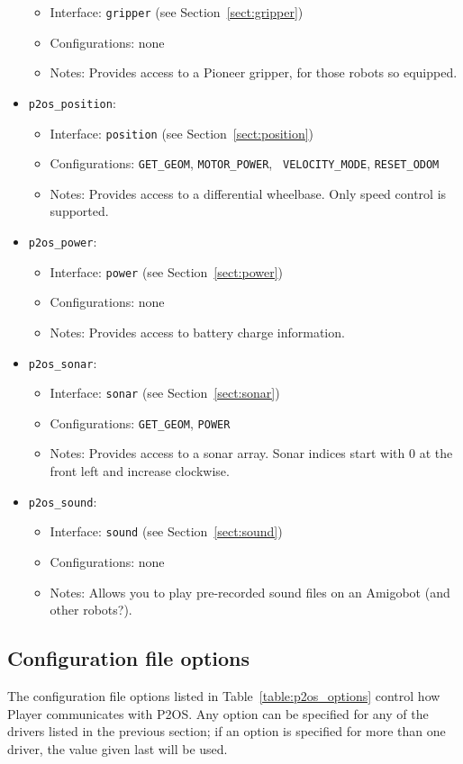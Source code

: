 \begin{itemize}
  \begin{itemize}
  \item Interface: {\tt gripper} (see Section~\ref{sect:gripper})
  \item Configurations: none
  \item Notes: Provides access to a Pioneer gripper, for those robots so
        equipped.
  \end{itemize}
\item {\tt p2os\_position}:
  \begin{itemize}
  \item Interface: {\tt position} (see Section~\ref{sect:position})
  \item Configurations: {\tt GET\_GEOM}, {\tt MOTOR\_POWER}, {\tt
  VELOCITY\_MODE}, {\tt RESET\_ODOM}
  \item Notes: Provides access to a differential wheelbase.  Only speed control 
  is supported.
  \end{itemize}
\item {\tt p2os\_power}:
  \begin{itemize}
  \item Interface: {\tt power} (see Section~\ref{sect:power})
  \item Configurations: none
  \item Notes: Provides access to battery charge information.
  \end{itemize}
\item {\tt p2os\_sonar}:
  \begin{itemize}
  \item Interface: {\tt sonar} (see Section~\ref{sect:sonar})
  \item Configurations: {\tt GET\_GEOM}, {\tt POWER}
  \item Notes: Provides access to a sonar array.  Sonar indices start with 0
  at the front left and increase clockwise.
  \end{itemize}
\item {\tt p2os\_sound}:
  \begin{itemize}
  \item Interface: {\tt sound} (see Section~\ref{sect:sound})
  \item Configurations: none
  \item Notes: Allows you to play pre-recorded sound files on an Amigobot
  (and other robots?).
  \end{itemize}
\end{itemize}

\subsection*{Configuration file options}
The configuration file options listed in Table~\ref{table:p2os_options}
control how Player communicates with P2OS.  Any option can be specified for
any of the drivers listed in the previous section; if an option is specified
for more than one driver, the value given last will be used.

